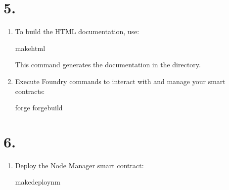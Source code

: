 \documentclass[a4paper,10pt,english]{sphinxmanual}
\begin{document}
\section{5. }
\label{\detokenize{quickstart:building-and-running-the-project}}\begin{enumerate}
%
\item {} 
\sphinxAtStartPar
{}

\sphinxAtStartPar
To build the HTML documentation, use:

\begin{sphinxVerbatim}[commandchars=\\\{\}]
makehtml
\end{sphinxVerbatim}

\sphinxAtStartPar
This command generates the documentation in the  directory.

\item {} 
\sphinxAtStartPar
{}

\sphinxAtStartPar
Execute Foundry commands to interact with and manage your smart contracts:

\begin{sphinxVerbatim}[commandchars=\\\{\}]
forge
forgebuild
\end{sphinxVerbatim}

\end{enumerate}


\section{6. }
\label{\detokenize{quickstart:deploying-smart-contracts}}\label{\detokenize{quickstart:deployment}}\begin{enumerate}
%
\item {} 
\sphinxAtStartPar
{}

\sphinxAtStartPar
Deploy the Node Manager smart contract:

\begin{sphinxVerbatim}[commandchars=\\\{\}]
makedeploy\PYGZhy{}nm
\end{sphinxVerbatim}

\end{enumerate}
\end{document}
